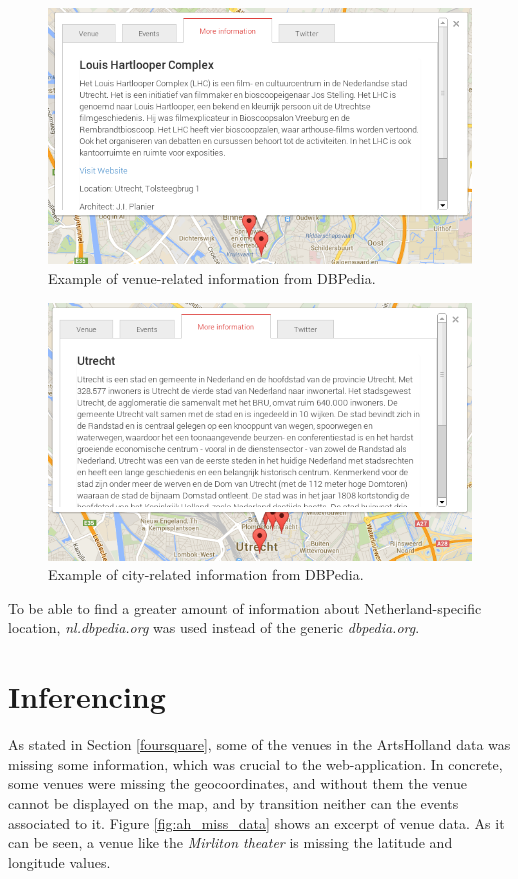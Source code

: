 \documentclass[hidelinks,a4paper]{article}
\begin{document}
\begin{figure}[h!]
  \centering
    \includegraphics[scale=0.5]{images/infoDBP1.png}    
    \caption{Example of venue-related information from DBPedia.}
\end{figure}

\begin{figure}[h!]
  \centering
    \includegraphics[scale=0.5]{images/inforDBP2.png}    
    \caption{Example of city-related information from DBPedia.}
\end{figure}

To be able to find a greater amount of information about Netherland-specific location, \textit{nl.dbpedia.org} was used instead of the generic \textit{dbpedia.org}.

\section{Inferencing}\label{inferencing}
As stated in Section \ref{foursquare}, some of the venues in the ArtsHolland data was missing some information, which was crucial to the web-application. In concrete, some venues were missing the geocoordinates, and without them the venue cannot be displayed on the map, and by transition neither can the events associated to it. Figure \ref{fig:ah_miss_data} shows an excerpt of venue data. As it can be seen, a venue like the \emph{Mirliton theater} is missing the latitude and longitude values.
\end{document}
